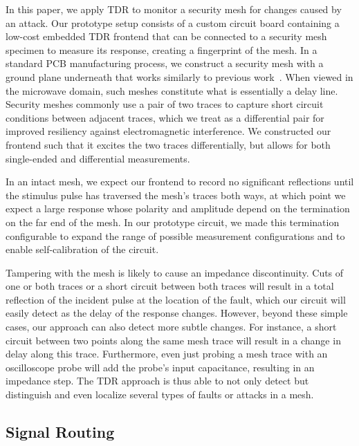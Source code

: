\documentclass[final]{iacrtrans}
\begin{document}
In this paper, we apply TDR to monitor a security mesh for changes caused by an attack. Our prototype setup consists of
a custom circuit board containing a low-cost embedded TDR frontend that can be connected to a security mesh specimen to
measure its response, creating a fingerprint of the mesh. In a standard PCB manufacturing process, we construct a
security mesh with a ground plane underneath that works similarly to previous work~\cite{
    immlerBTREPIDBatterylessTamperresistant2018,
    obermaierMeasurementSystemCapacitive2018,
    garbTamperSensitiveDesignPUFBased}.
When viewed in the microwave domain, such meshes constitute what is essentially a delay line. Security meshes commonly
use a pair of two traces to capture short circuit conditions between adjacent traces, which we treat as a differential
pair for improved resiliency against electromagnetic interference. We constructed our frontend such that it excites the
two traces differentially, but allows for both single-ended and differential measurements.

In an intact mesh, we expect our frontend to record no significant reflections until the stimulus pulse has traversed
the mesh's traces both ways, at which point we expect a large response whose polarity and amplitude depend on the
termination on the far end of the mesh. In our prototype circuit, we made this termination configurable to expand the
range of possible measurement configurations and to enable self-calibration of the circuit.

Tampering with the mesh is likely to cause an impedance discontinuity. Cuts of one or both traces or a short circuit
between both traces will result in a total reflection of the incident pulse at the location of the fault, which our
circuit will easily detect as the delay of the response changes. However, beyond these simple cases, our approach can
also detect more subtle changes. For instance, a short circuit between two points along the same mesh trace will result
in a change in delay along this trace. Furthermore, even just probing a mesh trace with an oscilloscope probe will add
the probe's input capacitance, resulting in an impedance step. The TDR approach is thus able to not only detect but
distinguish and even localize several types of faults or attacks in a mesh.

\subsection{Signal Routing}
\end{document}
